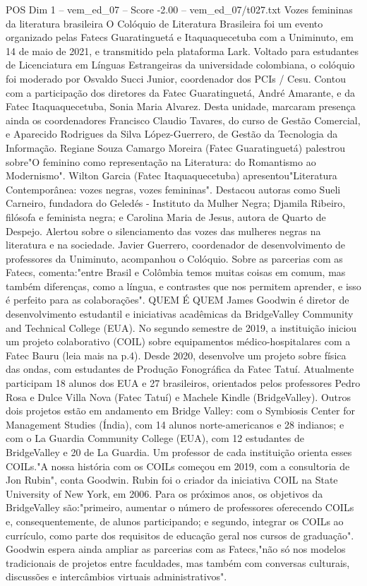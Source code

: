 \begin{textsample}{POS Dim 1 – vem\_ed\_07 – Score -2.00 – vem\_ed\_07/t027.txt}  \label{ex:f1_pos_090}
Vozes femininas da literatura brasileira O Colóquio de Literatura Brasileira foi um evento organizado pelas Fatecs Guaratinguetá e Itaquaquecetuba com a Uniminuto, em 14 de maio de 2021, e transmitido pela plataforma Lark.
Voltado para estudantes de Licenciatura em Línguas Estrangeiras da universidade colombiana, o colóquio foi moderado por Osvaldo Succi Junior, coordenador dos PCIs / Cesu.
Contou com a participação dos diretores da Fatec Guaratinguetá, André Amarante, e da Fatec Itaquaquecetuba, Sonia Maria Alvarez.
Desta unidade, marcaram presença ainda os coordenadores Francisco Claudio Tavares, do curso de Gestão Comercial, e Aparecido Rodrigues da Silva López-Guerrero, de Gestão da Tecnologia da Informação.
Regiane Souza Camargo Moreira (Fatec Guaratinguetá) palestrou sobre"O feminino como representação na Literatura: do Romantismo ao Modernismo".
Wilton Garcia (Fatec Itaquaquecetuba) apresentou"Literatura Contemporânea: vozes negras, vozes femininas".
Destacou autoras como Sueli Carneiro, fundadora do Geledés - Instituto da Mulher Negra; Djamila Ribeiro, filósofa e feminista negra; e Carolina Maria de Jesus, autora de Quarto de Despejo.
Alertou sobre o silenciamento das vozes das mulheres negras na literatura e na sociedade.
Javier Guerrero, coordenador de desenvolvimento de professores da Uniminuto, acompanhou o Colóquio.
Sobre as parcerias com as Fatecs, comenta:"entre Brasil e Colômbia temos muitas coisas em comum, mas também diferenças, como a língua, e contrastes que nos permitem aprender, e isso é perfeito para as colaborações".
QUEM É QUEM James Goodwin é diretor de desenvolvimento estudantil e iniciativas acadêmicas da BridgeValley Community and Technical College (EUA).
No segundo semestre de 2019, a instituição iniciou um projeto colaborativo (COIL) sobre equipamentos médico-hospitalares com a Fatec Bauru (leia mais na p.4).
Desde 2020, desenvolve um projeto sobre física das ondas, com estudantes de Produção Fonográfica da Fatec Tatuí.
Atualmente participam 18 alunos dos EUA e 27 brasileiros, orientados pelos professores Pedro Rosa e Dulce Villa Nova (Fatec Tatuí) e Machele Kindle (BridgeValley).
Outros dois projetos estão em andamento em Bridge Valley: com o Symbiosis Center for Management Studies (Índia), com 14 alunos norte-americanos e 28 indianos; e com o La Guardia Community College (EUA), com 12 estudantes de BridgeValley e 20 de La Guardia.
Um professor de cada instituição orienta esses COILs."A nossa história com os COILs começou em 2019, com a consultoria de Jon Rubin", conta Goodwin.
Rubin foi o criador da iniciativa COIL na State University of New York, em 2006.
Para os próximos anos, os objetivos da BridgeValley são:"primeiro, aumentar o número de professores oferecendo COILs e, consequentemente, de alunos participando; e segundo, integrar os COILs ao currículo, como parte dos requisitos de educação geral nos cursos de graduação".
Goodwin espera ainda ampliar as parcerias com as Fatecs,"não só nos modelos tradicionais de projetos entre faculdades, mas também com conversas culturais, discussões e intercâmbios virtuais administrativos".

\end{textsample}
